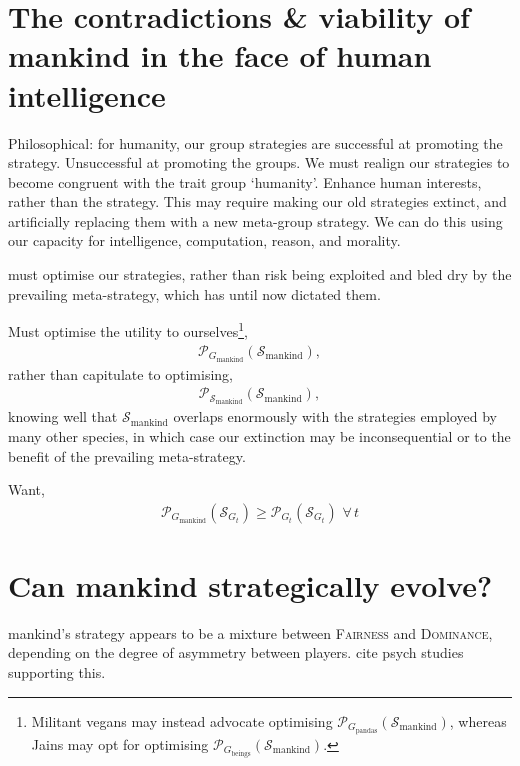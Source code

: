 \documentclass[twocolumn, aps, rmp, amsmath, amssymb, nofootinbib, superscriptaddress, longbibliography, floatfix, table-of-contents, eqsecnum]{revtex4-1}
\begin{document}
\section{The contradictions \& viability of mankind in the face of human intelligence}

Philosophical: for humanity, our group strategies are successful at promoting the strategy. Unsuccessful at promoting the groups. We must realign our strategies to become congruent with the trait group `humanity'. Enhance human interests, rather than the strategy. This may require making our old strategies extinct, and artificially replacing them with a new meta-group strategy. We can do this using our capacity for intelligence, computation, reason, and morality.

must optimise our strategies, rather than risk being exploited and bled dry by the prevailing meta-strategy, which has until now dictated them.

Must optimise the utility to ourselves\footnote{Militant vegans may instead advocate optimising $\mathcal{P}_{G_\text{pandas}}(\mathcal{S}_\text{mankind})$, whereas Jains may opt for optimising $\mathcal{P}_{G_\text{beings}}(\mathcal{S}_\text{mankind})$.},
\begin{align}
	\mathcal{P}_{G_\text{mankind}}(\mathcal{S}_\text{mankind}),
\end{align}
rather than capitulate to optimising,
\begin{align}
	\mathcal{P}_{\mathcal{S}_\text{mankind}}(\mathcal{S}_\text{mankind}),
\end{align}
knowing well that $\mathcal{S}_\text{mankind}$ overlaps enormously with the strategies employed by many other species, in which case our extinction may be inconsequential or to the benefit of the prevailing meta-strategy.

Want,
\begin{align}
\mathcal{P}_{G_\text{mankind}}(\mathcal{S}_{G_t}) \geq \mathcal{P}_{G_t}(\mathcal{S}_{G_t})\,\,\forall\, t
\end{align}

\section{Can mankind strategically evolve?}

mankind's strategy appears to be a mixture between \textsc{Fairness} and \textsc{Dominance}, depending on the degree of asymmetry between players. cite psych studies supporting this.
\end{document}
